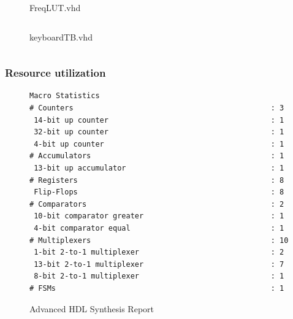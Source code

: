 \documentclass{article}
\begin{document}
        \newpage
	      \begin{figure}[H]
	        \caption{FreqLUT.vhd}
	      \end{figure}
        \begin{mdframed}[linecolor=black, topline=true, bottomline=true, leftline=false, rightline=false]
            \inputminted[linenos=true]{vhdl}{../OctaveKeyboard/FreqLUT.vhd}
        \end{mdframed}

        \newpage
        \begin{figure}[H]
          \caption{keyboardTB.vhd}
        \end{figure}
        \begin{mdframed}[linecolor=black, topline=true, bottomline=true, leftline=false, rightline=false]
            \inputminted[linenos=true]{vhdl}{../OctaveKeyboard/keyboardTB.vhd}
        \end{mdframed}

      \newpage
	    \subsubsection{Resource utilization}
			\begin{figure}[H]  
				\caption{Advanced HDL Synthesis Report}
	   			\begin{lstlisting}
Macro Statistics
# Counters                                             : 3
 14-bit up counter                                     : 1
 32-bit up counter                                     : 1
 4-bit up counter                                      : 1
# Accumulators                                         : 1
 13-bit up accumulator                                 : 1
# Registers                                            : 8
 Flip-Flops                                            : 8
# Comparators                                          : 2
 10-bit comparator greater                             : 1
 4-bit comparator equal                                : 1
# Multiplexers                                         : 10
 1-bit 2-to-1 multiplexer                              : 2
 13-bit 2-to-1 multiplexer                             : 7
 8-bit 2-to-1 multiplexer                              : 1
# FSMs                                                 : 1
	   			\end{lstlisting}
	   		\end{figure}
\end{document}
